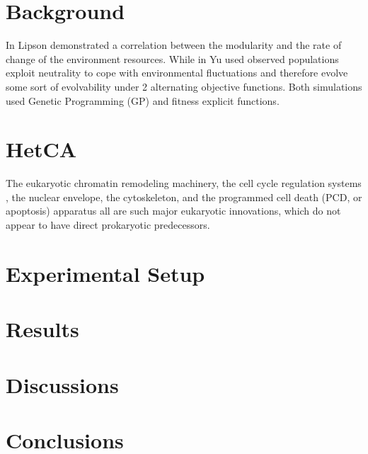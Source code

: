 \documentclass{sig-alternate-05-2015}
\begin{document}
\section{Background}
In \cite{lipson2002origin} Lipson demonstrated a correlation between the modularity and the rate of change of the environment resources. While in \cite{yu2007program} Yu used  observed populations exploit neutrality to cope with environmental fluctuations and therefore evolve some sort of evolvability under 2 alternating objective functions. Both simulations used Genetic Programming (GP) and fitness explicit functions.

\section{HetCA}

The eukaryotic chromatin remodeling machinery, the cell cycle regulation
systems \cite{koonin2002origin}, the nuclear envelope, the cytoskeleton, and the
programmed cell death (PCD, or apoptosis) apparatus all are
such major eukaryotic innovations, which do not appear to
have direct prokaryotic predecessors. 

\section{Experimental Setup}

\section{Results}

\section{Discussions}


\section{Conclusions}
{}



\end{document}
